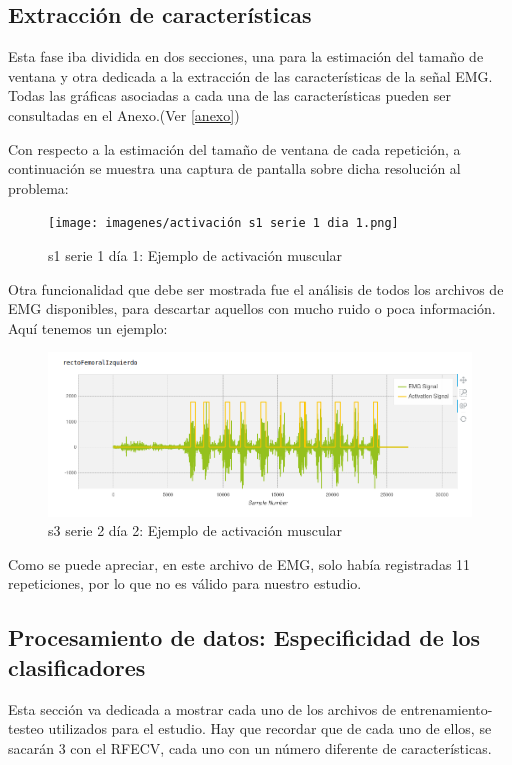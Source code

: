  \subsection{Extracción de características}
    Esta fase iba dividida en dos secciones, una para la estimación del tamaño de ventana y otra dedicada a la extracción de las características de la señal EMG.
    Todas las gráficas asociadas a cada una de las características pueden ser consultadas en el Anexo.(Ver \ref{anexo})

    Con respecto a la estimación del tamaño de ventana de cada repetición, a continuación se muestra una captura de pantalla sobre dicha resolución al problema:
    
    \begin{figure}[ht]
    \centering
    \texttt{[image: imagenes/activación s1 serie 1 dia 1.png]}
    \caption{ s1 serie 1 día 1: Ejemplo de activación muscular}
    \label{fig:s1 serie 1 dia 1}
    \end{figure}
    
    Otra funcionalidad que debe ser mostrada fue el análisis de todos los archivos de EMG disponibles, para descartar aquellos con mucho ruido o poca información. Aquí tenemos un ejemplo:
    
    \begin{figure}[ht]
    \centering
    \includegraphics[scale=0.4]{imagenes/s3 serie 2 dia 2.png}
    \caption{ s3 serie 2 día 2: Ejemplo de activación muscular}
    \label{fig:s1 serie 1 dia 1 error}
    \end{figure}
    
    Como se puede apreciar, en este archivo de EMG, solo había registradas 11 repeticiones, por lo que no es válido para nuestro estudio.
    
    
    \subsection{Procesamiento de datos: Especificidad de los clasificadores}
    Esta sección va dedicada a mostrar cada uno de los archivos de entrenamiento-testeo utilizados para el estudio. Hay que recordar que de cada uno de ellos, se sacarán 3 con el RFECV, cada uno con un número diferente de características.

